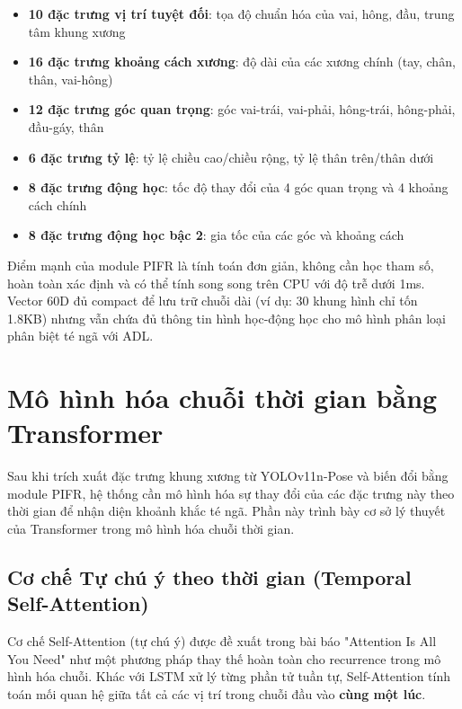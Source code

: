 \begin{itemize}
    \item \textbf{10 đặc trưng vị trí tuyệt đối}: tọa độ chuẩn hóa của vai, hông, đầu, trung tâm khung xương
    \item \textbf{16 đặc trưng khoảng cách xương}: độ dài của các xương chính (tay, chân, thân, vai-hông)
    \item \textbf{12 đặc trưng góc quan trọng}: góc vai-trái, vai-phải, hông-trái, hông-phải, đầu-gáy, thân
    \item \textbf{6 đặc trưng tỷ lệ}: tỷ lệ chiều cao/chiều rộng, tỷ lệ thân trên/thân dưới
    \item \textbf{8 đặc trưng động học}: tốc độ thay đổi của 4 góc quan trọng và 4 khoảng cách chính
    \item \textbf{8 đặc trưng động học bậc 2}: gia tốc của các góc và khoảng cách
\end{itemize}

Điểm mạnh của module PIFR là tính toán đơn giản, không cần học tham số, hoàn toàn xác định và có thể tính song song trên CPU với độ trễ dưới 1ms. Vector 60D đủ compact để lưu trữ chuỗi dài (ví dụ: 30 khung hình chỉ tốn 1.8KB) nhưng vẫn chứa đủ thông tin hình học-động học cho mô hình phân loại phân biệt té ngã với ADL.


\section{Mô hình hóa chuỗi thời gian bằng Transformer}
\label{sec:transformer}

Sau khi trích xuất đặc trưng khung xương từ YOLOv11n-Pose và biến đổi bằng module PIFR, hệ thống cần mô hình hóa sự thay đổi của các đặc trưng này theo thời gian để nhận diện khoảnh khắc té ngã. Phần này trình bày cơ sở lý thuyết của Transformer trong mô hình hóa chuỗi thời gian.

\subsection{Cơ chế Tự chú ý theo thời gian (Temporal Self-Attention)}
\label{sec:temporal_self_attention}

Cơ chế Self-Attention (tự chú ý) được đề xuất trong bài báo "Attention Is All You Need" \cite{vaswani2017attention} như một phương pháp thay thế hoàn toàn cho recurrence trong mô hình hóa chuỗi. Khác với LSTM xử lý từng phần tử tuần tự, Self-Attention tính toán mối quan hệ giữa tất cả các vị trí trong chuỗi đầu vào \textbf{cùng một lúc}.

